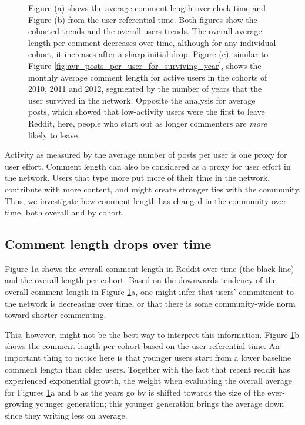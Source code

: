 \begin{figure}[!tb]
\begin{subfigure}{1\textwidth}
\caption{}\end{subfigure}
\caption{Figure (a) shows the average comment length over clock time and Figure (b) from the user-referential time. Both figures show the cohorted trends and the overall users trends.  The overall average length per comment decreases over time, although for any individual cohort, it increases after a sharp initial drop. Figure (c), similar to Figure \ref{fig:avr_posts_per_user_for_surviving_year}, shows the monthly average comment length for active users in the cohorts of 2010, 2011 and 2012, segmented by the number of years that the user survived in the network.  Opposite the analysis for average posts, which showed that low-activity users were the first to leave Reddit, here, people who start out as longer commenters are \textit{more} likely to leave.}
\label{fig:comment_length}
\end{figure}

Activity as measured by the average number of posts per user is one proxy for user effort.  Comment length can also be considered as a proxy for user effort in the network.  Users that type more put more of their time in the network, contribute with more content, and might create stronger ties with the community.  Thus, we investigate how comment length has changed in the community over time, both overall and by cohort. 

\subsection{Comment length drops over time}

Figure \ref{fig:comment_length}a shows the overall comment length in Reddit over time (the black line) and the overall length per cohort. 
Based on the downwards tendency of the overall comment length in Figure \ref{fig:comment_length}a, one might infer that users' commitment to the network is decreasing over time, or that there is some community-wide norm toward shorter commenting. 

This, however, might not be the best way to interpret this information. Figure \ref{fig:comment_length}b shows the comment length per cohort based on the user referential time.  
An important thing to notice here is that younger users start from a lower baseline comment length than older users. Together with the fact that recent reddit has experienced exponential growth, the weight when evaluating the overall average for Figures \ref{fig:comment_length}a and b as the years go by is shifted towards the size of the ever-growing younger generation; this younger generation brings the average down since they writing less on average.

